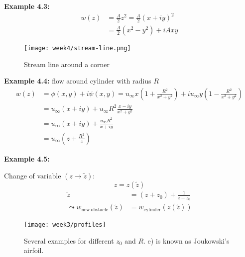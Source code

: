 \textbf{Example 4.3:}
\begin{align}
w(z) &= \frac{A}{2}z^2 = \frac{A}{2}(x+iy)^2\\
&= \frac{A}{2}(x^2-y^2)+iAxy
\end{align}

\begin{figure}[!h]
	\centering
	\texttt{[image: week4/stream-line.png]}\\
	\caption{Stream line around a corner}
	\label{fig:corner_stream_line}
\end{figure}

\textbf{Example 4.4:} flow around cylinder with radius $R$
\begin{align}
w(z) &= \phi(x,y) +i\psi(x,y) = u_\infty x\left(1+\frac{R^2}{x^2+y^2}\right) + iu_\infty y \left(1-\frac{R^2}{x^2+y^2}\right) \\
& =u_\infty(x+iy) + u_\infty R^2\frac{x-iy}{x^2+y^2} \\
&= u_\infty(x+iy)+\frac{u_\infty R^2}{x+iy}\\
&= u_\infty\left(z+\frac{R^2}{z}\right)
\end{align}

\textbf{Example 4.5:}

Change of variable $(z\rightarrow\tilde{z})$:
\begin{equation}
z=z(\tilde{z})
\end{equation}
\begin{align}
\tilde{z} &= (z+z_0)+\frac{1}{z+z_0}\\
\leadsto
w_\mathrm{new\ obstacle}(\tilde{z}) &= w_\mathrm{cylinder}(z(\tilde{z}))
\end{align}

\begin{figure}[!h]
    \centering
    \texttt{[image: week3/profiles]}\\
    \caption{Several examples for different $z_0$ and $R$. e) is known as Joukowski's airfoil.}
    \label{fig:profiles}
\end{figure}
